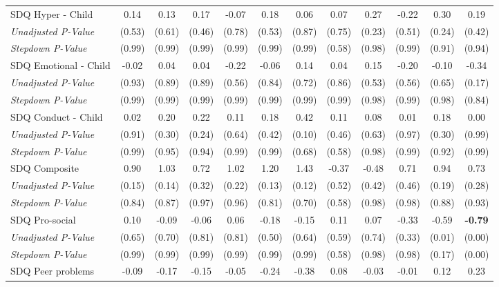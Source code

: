 \begin{tabular}{l c c c c c c c c c c c}
SDQ Hyper - Child & 0.14 & 0.13 & 0.17 & -0.07 & 0.18 & 0.06 & 0.07 & 0.27 & -0.22 & 0.30 & 0.19 \\
\quad \textit{Unadjusted P-Value} & (0.53) & (0.61) & (0.46) & (0.78) & (0.53) & (0.87) & (0.75) & (0.23) & (0.51) & (0.24) & (0.42) \\
\quad \textit{Stepdown P-Value} & (0.99) & (0.99) & (0.99) & (0.99) & (0.99) & (0.99) & (0.58) & (0.98) & (0.99) & (0.91) & (0.94) \\
SDQ Emotional - Child & -0.02 & 0.04 & 0.04 & -0.22 & -0.06 & 0.14 & 0.04 & 0.15 & -0.20 & -0.10 & -0.34 \\
\quad \textit{Unadjusted P-Value} & (0.93) & (0.89) & (0.89) & (0.56) & (0.84) & (0.72) & (0.86) & (0.53) & (0.56) & (0.65) & (0.17) \\
\quad \textit{Stepdown P-Value} & (0.99) & (0.99) & (0.99) & (0.99) & (0.99) & (0.99) & (0.99) & (0.98) & (0.99) & (0.98) & (0.84) \\
SDQ Conduct - Child & 0.02 & 0.20 & 0.22 & 0.11 & 0.18 & 0.42 & 0.11 & 0.08 & 0.01 & 0.18 & 0.00 \\
\quad \textit{Unadjusted P-Value} & (0.91) & (0.30) & (0.24) & (0.64) & (0.42) & (0.10) & (0.46) & (0.63) & (0.97) & (0.30) & (0.99) \\
\quad \textit{Stepdown P-Value} & (0.99) & (0.95) & (0.94) & (0.99) & (0.99) & (0.68) & (0.58) & (0.98) & (0.99) & (0.92) & (0.99) \\
SDQ Composite & 0.90 & 1.03 & 0.72 & 1.02 & 1.20 & 1.43 & -0.37 & -0.48 & 0.71 & 0.94 & 0.73 \\
\quad \textit{Unadjusted P-Value} & (0.15) & (0.14) & (0.32) & (0.22) & (0.13) & (0.12) & (0.52) & (0.42) & (0.46) & (0.19) & (0.28) \\
\quad \textit{Stepdown P-Value} & (0.84) & (0.87) & (0.97) & (0.96) & (0.81) & (0.70) & (0.58) & (0.98) & (0.98) & (0.88) & (0.93) \\
SDQ Pro-social & 0.10 & -0.09 & -0.06 & 0.06 & -0.18 & -0.15 & 0.11 & 0.07 & -0.33 & -0.59 & \textbf{ -0.79 } \\
\quad \textit{Unadjusted P-Value} & (0.65) & (0.70) & (0.81) & (0.81) & (0.50) & (0.64) & (0.59) & (0.74) & (0.33) & (0.01) & (0.00) \\
\quad \textit{Stepdown P-Value} & (0.99) & (0.99) & (0.99) & (0.99) & (0.99) & (0.99) & (0.58) & (0.98) & (0.98) & (0.17) & (0.00) \\
SDQ Peer problems & -0.09 & -0.17 & -0.15 & -0.05 & -0.24 & -0.38 & 0.08 & -0.03 & -0.01 & 0.12 & 0.23 \\

\end{tabular}
